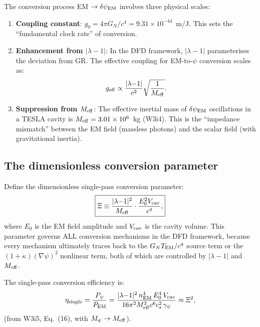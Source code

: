 \documentclass[11pt]{article}
\newcommand{\ee}[1]{\times 10^{#1}}
\newcommand{\dpsiEM}{\delta\psi_{\rm EM}}
\newcommand{\Meff}{M_{\rm eff}}
\newcommand{\lambdaone}{|\lambda{-}1|}
\newcommand{\GN}{G_N}
\begin{document}
The conversion process EM $\to \dpsiEM$ involves three physical scales:

\begin{enumerate}
\item \textbf{Coupling constant}: $g_0 = 4\pi\GN/c^4 = 9.31\ee{-44}$~m/J.
  This sets the ``fundamental clock rate'' of conversion.

\item \textbf{Enhancement from $\lambdaone$}: In the DFD framework,
  $|\lambda - 1|$ parameterises the deviation from GR. The effective
  coupling for EM-to-$\psi$ conversion scales as:
  \begin{equation}
  g_{\rm eff} \propto \frac{\lambdaone}{c^2}\sqrt{\frac{1}{\Meff}}.
  \label{eq:g-eff}
  \end{equation}

\item \textbf{Suppression from $\Meff$}: The effective inertial mass of
  $\dpsiEM$ oscillations in a TESLA cavity is $\Meff = 3.01\ee{6}$~kg
  (W3i4). This is the ``impedance mismatch'' between the EM field
  (massless photons) and the scalar field (with gravitational inertia).
\end{enumerate}

\subsection{The dimensionless conversion parameter}

Define the dimensionless single-pass conversion parameter:
\begin{equation}
\boxed{
\Xi \equiv \frac{\lambdaone^2}{\Meff} \cdot \frac{E_0^2 V_{\rm cav}}
{c^4},
}
\label{eq:Xi-definition}
\end{equation}
where $E_0$ is the EM field amplitude and $V_{\rm cav}$ is the cavity
volume. This parameter governs ALL conversion mechanisms in the DFD
framework, because every mechanism ultimately traces back to the
$\GN T_{\rm EM}/c^4$ source term or the $(1+\kappa)(\nabla\psi)^2$
nonlinear term, both of which are controlled by $\lambdaone$ and $\Meff$.

The single-pass conversion efficiency is:
\begin{equation}
\eta_{\rm single} = \frac{P_\psi}{P_{\rm EM}}
= \frac{\lambdaone^2\,n_{\rm EM}^4\,E_0^4\,V_{\rm cav}}
{16\pi^2 \Meff^2 c^6 c_s^2\,\gamma_\psi} \approx \Xi^2,
\label{eq:eta-single}
\end{equation}
(from W3i5, Eq.~(16), with $M_\psi \to \Meff$).
\end{document}
